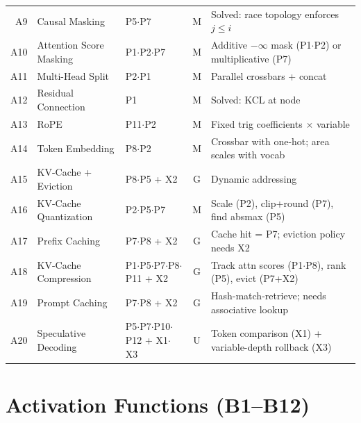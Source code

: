 \documentclass[10pt]{article}
\begin{document}
\begin{longtable}{rlp{3.0cm}cp{4.8cm}}
A9 & Causal Masking & P5$\cdot$P7 & M & Solved: race topology enforces $j \leq i$ \\
A10 & Attention Score Masking & P1$\cdot$P2$\cdot$P7 & M & Additive $-\infty$ mask (P1$\cdot$P2) or multiplicative (P7) \\
A11 & Multi-Head Split & P2$\cdot$P1 & M & Parallel crossbars + concat \\
A12 & Residual Connection & P1 & M & Solved: KCL at node \\
A13 & RoPE & P11$\cdot$P2 & M & Fixed trig coefficients $\times$ variable \\
A14 & Token Embedding & P8$\cdot$P2 & M & Crossbar with one-hot; area scales with vocab \\
A15 & KV-Cache + Eviction & P8$\cdot$P5 + X2 & G & Dynamic addressing \\
A16 & KV-Cache Quantization & P2$\cdot$P5$\cdot$P7 & M & Scale (P2), clip+round (P7), find absmax (P5) \\
A17 & Prefix Caching & P7$\cdot$P8 + X2 & G & Cache hit = P7; eviction policy needs X2 \\
A18 & KV-Cache Compression & P1$\cdot$P5$\cdot$P7$\cdot$P8$\cdot$P11 + X2 & G & Track attn scores (P1$\cdot$P8), rank (P5), evict (P7+X2) \\
A19 & Prompt Caching & P7$\cdot$P8 + X2 & G & Hash-match-retrieve; needs associative lookup \\
A20 & Speculative Decoding & P5$\cdot$P7$\cdot$P10$\cdot$P12 + X1$\cdot$X3 & U & Token comparison (X1) + variable-depth rollback (X3) \\
\end{longtable}

\section{Activation Functions (B1--B12)}
\end{document}
